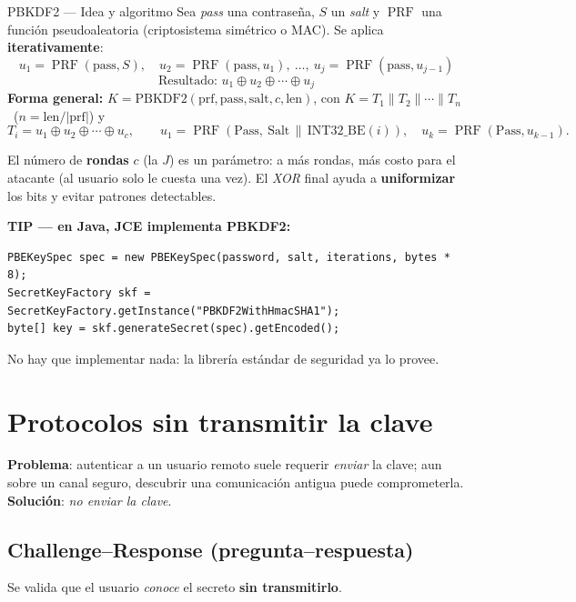 \documentclass[11pt,a4paper]{article}
\DeclareMathOperator{\PRF}{PRF}
\begin{document}
\begin{defbox}{PBKDF2 — Idea y algoritmo}
Sea \emph{pass} una contraseña, $S$ un \emph{salt} y $\PRF$ una función pseudoaleatoria
(criptosistema simétrico o MAC). Se aplica \textbf{iterativamente}:
\[
  u_1 = \PRF(\text{pass}, S),\quad
  u_2 = \PRF(\text{pass}, u_1),\ \dots,\
  u_j = \PRF(\text{pass}, u_{j-1})
\]
\[
  \text{Resultado: } u_1 \oplus u_2 \oplus \cdots \oplus u_j
\]
\textbf{Forma general:} $K = \mathrm{PBKDF2}(\text{prf},\text{pass},\text{salt},c,\text{len})$,
con $K = T_1 \| T_2 \| \cdots \| T_n$ \ ($n=\text{len}/|\text{prf}|$) y
\[
  T_i = u_1 \oplus u_2 \oplus \cdots \oplus u_c,\qquad
  u_1 = \PRF(\text{Pass},\ \text{Salt}\,\|\,\mathrm{INT32\_BE}(i)),\quad
  u_k = \PRF(\text{Pass}, u_{k-1}).
\]
\end{defbox}

El número de \textbf{rondas} $c$ (la $J$) es un parámetro: a más rondas, más costo para el
atacante (al usuario solo le cuesta una vez). El \emph{XOR} final ayuda a \textbf{uniformizar}
los bits y evitar patrones detectables.

\begin{slidebox}
\textbf{TIP — en Java, JCE implementa PBKDF2:}
\begin{lstlisting}[style=java]
PBEKeySpec spec = new PBEKeySpec(password, salt, iterations, bytes * 8);
SecretKeyFactory skf = SecretKeyFactory.getInstance("PBKDF2WithHmacSHA1");
byte[] key = skf.generateSecret(spec).getEncoded();
\end{lstlisting}
No hay que implementar nada: la librería estándar de seguridad ya lo provee.
\end{slidebox}

\section{Protocolos sin transmitir la clave}

\textbf{Problema}: autenticar a un usuario remoto suele requerir \emph{enviar} la clave; aun
sobre un canal seguro, descubrir una comunicación antigua puede comprometerla.
\textbf{Solución}: \emph{no enviar la clave}.

\subsection{Challenge--Response (pregunta--respuesta)}
Se valida que el usuario \emph{conoce} el secreto \textbf{sin transmitirlo}.
\end{document}
